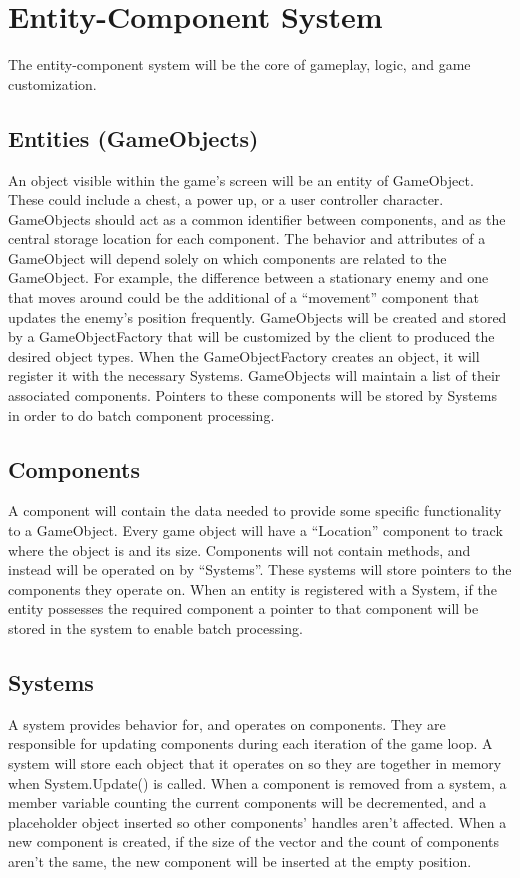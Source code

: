 \documentclass[12pt]{article}
\begin{document}
\section{Entity-Component System}
The entity-component system will be the core of gameplay, logic, and game customization.  

\subsection{Entities (GameObjects)}
An object visible within the game's screen will be an entity of GameObject.  These could include a chest, a power up, or a user controller character.  GameObjects should act as a common identifier between components, and as the central storage location for each component.  The behavior and attributes of a GameObject will depend solely on which components are related to the GameObject.  For example, the difference between a stationary enemy and one that moves around could be the additional of a ``movement'' component that updates the enemy's position frequently.  GameObjects will be created and stored by a GameObjectFactory that will be customized by the client to produced the desired object types.  When the GameObjectFactory creates an object, it will register it with the necessary Systems.  GameObjects will maintain a list of their associated components.  Pointers to these components will be stored by Systems in order to do batch component processing.    

\subsection{	Components}
A component will contain the data needed to provide some specific functionality to a GameObject.  Every game object will have a ``Location'' component to track where the object is and its size.  Components will not contain methods, and instead will be operated on by ``Systems''.  These systems will store pointers to the components they operate on.  When an entity is registered with a System, if the entity possesses the required component a pointer to that component will be stored in the system to enable batch processing. 

\subsection{	Systems} 
A system provides behavior for, and operates on components.  They are responsible for updating components during each iteration of the game loop.  A system will store each object that it operates on so they are together in memory when System.Update() is called.  When a component is removed from a system, a member variable counting the current components will be decremented, and a placeholder object inserted so other components' handles aren't affected.  When a new component is created, if the size of the vector and the count of components aren't the same, the new component will be inserted at the empty position.  
\end{document}
